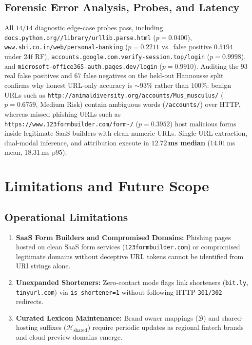 \documentclass[12pt,a4paper]{report}
\begin{document}
\section{Forensic Error Analysis, Probes, and Latency}
All $14/14$ diagnostic edge-case probes pass, including \texttt{docs.\allowbreak python.org//library/\allowbreak urllib.\allowbreak parse.html} ($p=0.0400$), \texttt{www.sbi.co.in/\allowbreak web/\allowbreak personal-\allowbreak banking} ($p=0.2211$ vs.\ false positive $0.5194$ under 24f RF), \texttt{accounts.\allowbreak google.com.\allowbreak verify-\allowbreak session.top/\allowbreak login} ($p=0.9998$), and \texttt{microsoft-\allowbreak office365-\allowbreak auth.\allowbreak pages.dev/\allowbreak login} ($p=0.9910$). Auditing the $93$ real false positives and $67$ false negatives on the held-out Hannousse split confirms why honest URL-only accuracy is $\sim 93\%$ rather than $100\%$: benign URLs such as \texttt{http://animal\allowbreak diversity.org/\allowbreak accounts/\allowbreak Mus\_musculus/} ($p=0.6759$, Medium Risk) contain ambiguous words (\texttt{/accounts/}) over HTTP, whereas missed phishing URLs such as \texttt{https://www.\allowbreak 123form\allowbreak builder.com/\allowbreak form-/} ($p=0.3952$) host malicious forms inside legitimate SaaS builders with clean numeric URLs. Single-URL extraction, dual-modal inference, and attribution execute in \textbf{$12.72$\,ms median} ($14.01$\,ms mean, $18.31$\,ms p95).

\chapter{Limitations and Future Scope}

\section{Operational Limitations}
\begin{enumerate}
\item \textbf{SaaS Form Builders and Compromised Domains:} Phishing pages hosted on clean SaaS form services (\texttt{123formbuilder.com}) or compromised legitimate domains without deceptive URL tokens cannot be identified from URI strings alone.
\item \textbf{Unexpanded Shorteners:} Zero-contact mode flags link shorteners (\texttt{bit.ly}, \texttt{tinyurl.com}) via \texttt{is\_shortener=1} without following HTTP \texttt{301/302} redirects.
\item \textbf{Curated Lexicon Maintenance:} Brand owner mappings ($\mathcal{B}$) and shared-hosting suffixes ($\mathcal{H}_{\text{shared}}$) require periodic updates as regional fintech brands and cloud preview domains emerge.
\end{enumerate}
\end{document}
